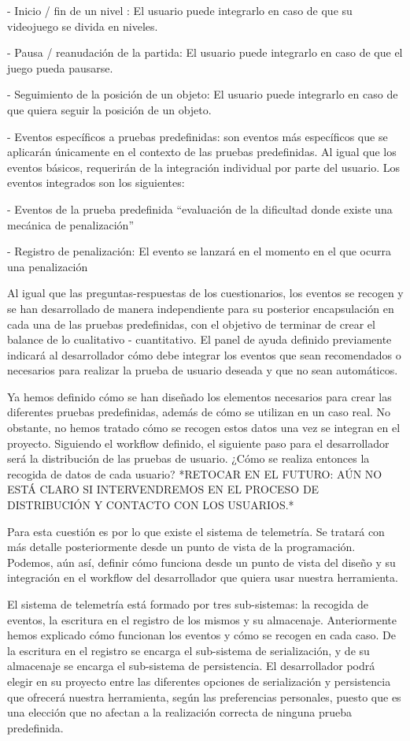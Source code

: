     - Inicio / fin de un nivel : El usuario puede integrarlo en caso de que su videojuego se divida en niveles.

    - Pausa / reanudación de la partida: El usuario puede integrarlo en caso de que el juego pueda pausarse.

    - Seguimiento de la posición de un objeto: El usuario puede integrarlo en caso de que quiera seguir la posición de un objeto.

- Eventos específicos a pruebas predefinidas: son eventos más específicos que se aplicarán únicamente en el contexto de las pruebas predefinidas. Al igual que los eventos básicos, requerirán de la integración individual por parte del usuario. Los eventos integrados son los siguientes:
   
    - Eventos de la prueba predefinida “evaluación de la dificultad donde existe una mecánica de penalización”

        - Registro de penalización: El evento se lanzará en el momento en el que ocurra una penalización

Al igual que las preguntas-respuestas de los cuestionarios, los eventos se recogen y se han desarrollado de manera independiente para su posterior encapsulación en cada una de las pruebas predefinidas, con el objetivo de terminar de crear el balance de lo cualitativo - cuantitativo. El panel de ayuda definido previamente indicará al desarrollador cómo debe integrar los eventos que sean recomendados o necesarios para realizar la prueba de usuario deseada y que no sean automáticos.

Ya hemos definido cómo se han diseñado los elementos necesarios para crear las diferentes pruebas predefinidas, además de cómo se utilizan en un caso real. No obstante, no hemos tratado cómo se recogen estos datos una vez se integran en el proyecto. Siguiendo el workflow definido, el siguiente paso para el desarrollador será la distribución de las pruebas de usuario. ¿Cómo se realiza entonces la recogida de datos de cada usuario? *RETOCAR EN EL FUTURO: AÚN NO ESTÁ CLARO SI INTERVENDREMOS EN EL PROCESO DE DISTRIBUCIÓN Y CONTACTO CON LOS USUARIOS.*

Para esta cuestión es por lo que existe el sistema de telemetría. Se tratará con más detalle posteriormente desde un punto de vista de la programación. Podemos, aún así, definir cómo funciona desde un punto de vista del diseño y su integración en el workflow del desarrollador que quiera usar nuestra herramienta.

El sistema de telemetría está formado por tres sub-sistemas: la recogida de eventos, la escritura en el registro de los mismos y su almacenaje. Anteriormente hemos explicado cómo funcionan los eventos y cómo se recogen en cada caso. De la escritura en el registro se encarga el sub-sistema de serialización, y de su almacenaje se encarga el sub-sistema de persistencia. El desarrollador podrá elegir en su proyecto entre las diferentes opciones de serialización y persistencia que ofrecerá nuestra herramienta, según las preferencias personales, puesto que es una elección que no afectan a la realización correcta de ninguna prueba predefinida. 

